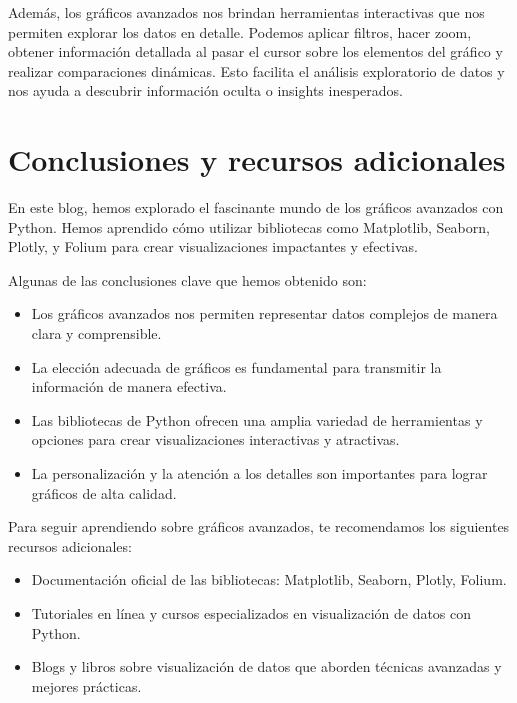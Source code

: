 \documentclass[
  a4paper,
]{article}
\providecommand{\tightlist}{%
  \setlength{\itemsep}{0pt}\setlength{\parskip}{0pt}}\usepackage{longtable,booktabs,array}
\begin{document}
Además, los gráficos avanzados nos brindan herramientas interactivas que
nos permiten explorar los datos en detalle. Podemos aplicar filtros,
hacer zoom, obtener información detallada al pasar el cursor sobre los
elementos del gráfico y realizar comparaciones dinámicas. Esto facilita
el análisis exploratorio de datos y nos ayuda a descubrir información
oculta o insights inesperados.

\hypertarget{conclusiones-y-recursos-adicionales}{%
\section{Conclusiones y recursos
adicionales}\label{conclusiones-y-recursos-adicionales}}

En este blog, hemos explorado el fascinante mundo de los gráficos
avanzados con Python. Hemos aprendido cómo utilizar bibliotecas como
Matplotlib, Seaborn, Plotly, y Folium para crear visualizaciones
impactantes y efectivas.

Algunas de las conclusiones clave que hemos obtenido son:

\begin{itemize}
\tightlist
\item
  Los gráficos avanzados nos permiten representar datos complejos de
  manera clara y comprensible.
\item
  La elección adecuada de gráficos es fundamental para transmitir la
  información de manera efectiva.
\item
  Las bibliotecas de Python ofrecen una amplia variedad de herramientas
  y opciones para crear visualizaciones interactivas y atractivas.
\item
  La personalización y la atención a los detalles son importantes para
  lograr gráficos de alta calidad.
\end{itemize}

Para seguir aprendiendo sobre gráficos avanzados, te recomendamos los
siguientes recursos adicionales:

\begin{itemize}
\tightlist
\item
  Documentación oficial de las bibliotecas: Matplotlib, Seaborn, Plotly,
  Folium.
\item
  Tutoriales en línea y cursos especializados en visualización de datos
  con Python.
\item
  Blogs y libros sobre visualización de datos que aborden técnicas
  avanzadas y mejores prácticas.
\end{itemize}
\end{document}
